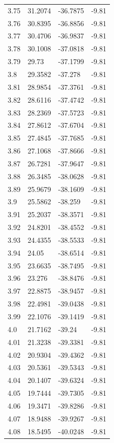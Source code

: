 \begin{tabular}{llll}
3.75 & 31.2074 & -36.7875 & -9.81 \\
3.76 & 30.8395 & -36.8856 & -9.81 \\
3.77 & 30.4706 & -36.9837 & -9.81 \\
3.78 & 30.1008 & -37.0818 & -9.81 \\
3.79 & 29.73 & -37.1799 & -9.81 \\
3.8 & 29.3582 & -37.278 & -9.81 \\
3.81 & 28.9854 & -37.3761 & -9.81 \\
3.82 & 28.6116 & -37.4742 & -9.81 \\
3.83 & 28.2369 & -37.5723 & -9.81 \\
3.84 & 27.8612 & -37.6704 & -9.81 \\
3.85 & 27.4845 & -37.7685 & -9.81 \\
3.86 & 27.1068 & -37.8666 & -9.81 \\
3.87 & 26.7281 & -37.9647 & -9.81 \\
3.88 & 26.3485 & -38.0628 & -9.81 \\
3.89 & 25.9679 & -38.1609 & -9.81 \\
3.9 & 25.5862 & -38.259 & -9.81 \\
3.91 & 25.2037 & -38.3571 & -9.81 \\
3.92 & 24.8201 & -38.4552 & -9.81 \\
3.93 & 24.4355 & -38.5533 & -9.81 \\
3.94 & 24.05 & -38.6514 & -9.81 \\
3.95 & 23.6635 & -38.7495 & -9.81 \\
3.96 & 23.276 & -38.8476 & -9.81 \\
3.97 & 22.8875 & -38.9457 & -9.81 \\
3.98 & 22.4981 & -39.0438 & -9.81 \\
3.99 & 22.1076 & -39.1419 & -9.81 \\
4.0 & 21.7162 & -39.24 & -9.81 \\
4.01 & 21.3238 & -39.3381 & -9.81 \\
4.02 & 20.9304 & -39.4362 & -9.81 \\
4.03 & 20.5361 & -39.5343 & -9.81 \\
4.04 & 20.1407 & -39.6324 & -9.81 \\
4.05 & 19.7444 & -39.7305 & -9.81 \\
4.06 & 19.3471 & -39.8286 & -9.81 \\
4.07 & 18.9488 & -39.9267 & -9.81 \\
4.08 & 18.5495 & -40.0248 & -9.81 \\

\end{tabular}
